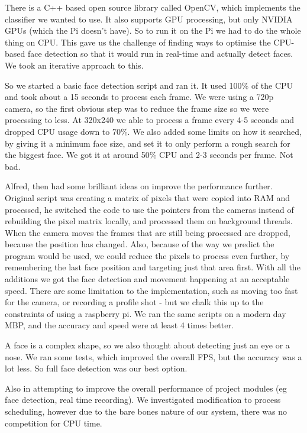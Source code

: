 \documentclass[11pt,a4paper,titlepage]{report}
\begin{document}
\begin{appendices}
There is a C++ based open source library called OpenCV, which implements the classifier we wanted to use. It also supports GPU processing, but only NVIDIA GPUs (which the Pi doesn’t have). So to run it on the Pi we had to do the whole thing on CPU. This gave us the challenge of finding ways to optimise the CPU-based face detection so that it would run in real-time and actually detect faces. We took an iterative approach to this.

So we started a basic face detection script and ran it. It used 100\% of the CPU and took about a 15 seconds to process each frame. We were using a 720p camera, so the first obvious step was to reduce the frame size so we were processing to less. At 320x240 we able to process a frame every 4-5 seconds and dropped CPU usage down to 70\%. We also added some limits on how it searched, by giving it a minimum face size, and set it to only perform a rough search for the biggest face. We got it at around 50\% CPU and 2-3 seconds per frame. Not bad.

Alfred, then had some brilliant ideas on improve the performance further. Original script was creating a matrix of pixels that were copied into RAM and processed, he switched the code to use the pointers from the cameras instead of rebuilding the pixel matrix locally, and processed them on background threads. When the camera moves the frames that are still being processed are dropped, because the position has changed. Also, because of the way we predict the program would be used, we could reduce the pixels to process even further, by remembering the last face position and targeting just that area first. With all the additions we got the face detection and movement happening at an acceptable speed. There are some limitation to the implementation, such as moving too fast for the camera, or recording a profile shot - but we chalk this up to the constraints of using a raspberry pi. We ran the same scripts on a modern day MBP, and the accuracy and speed were at least 4 times better.

A face is a complex shape, so we also thought about detecting just an eye or a nose. We ran some  tests, which improved the overall FPS, but the accuracy was a lot less. So full face detection was our best option. 

Also in attempting to improve the overall performance of project modules (eg face detection, real time recording). We investigated modification to process scheduling, however due to the bare bones nature of our system, there was no competition for CPU time.


\end{appendices}
\end{document}
